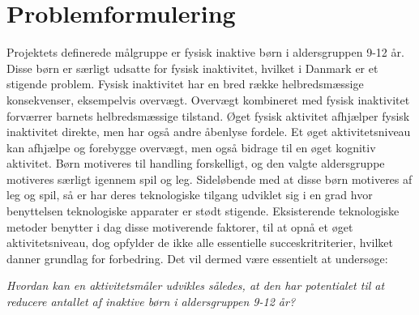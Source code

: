 \newpage \section{Problemformulering}\label{Problemformulering}
Projektets definerede målgruppe er fysisk inaktive børn i aldersgruppen 9-12 år. Disse børn er særligt udsatte for fysisk inaktivitet, hvilket i Danmark er et stigende problem. Fysisk inaktivitet har en bred række helbredsmæssige konsekvenser, eksempelvis overvægt. Overvægt kombineret med fysisk inaktivitet forværrer barnets helbredsmæssige tilstand. Øget fysisk aktivitet afhjælper fysisk inaktivitet direkte, men har også andre åbenlyse fordele. Et øget aktivitetsniveau kan afhjælpe og forebygge overvægt, men også bidrage til en øget kognitiv aktivitet. Børn motiveres til handling forskelligt, og den valgte aldersgruppe motiveres særligt igennem spil og leg. Sideløbende med at disse børn motiveres af leg og spil, så er har deres teknologiske tilgang udviklet sig i en grad hvor benyttelsen teknologiske apparater er stødt stigende. Eksisterende teknologiske metoder benytter i dag disse motiverende faktorer, til at opnå et øget aktivitetsniveau, dog opfylder de ikke alle essentielle succeskritriterier, hvilket danner grundlag for forbedring. Det vil dermed være essentielt at undersøge:


\begin{center}
\textit{Hvordan kan en aktivitetsmåler udvikles således, at den har potentialet til at reducere antallet af inaktive børn i aldersgruppen 9-12 år?}
\end{center}

%
%	

